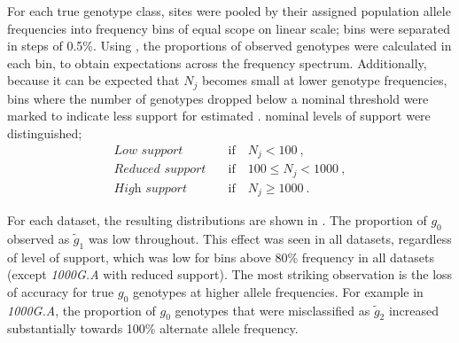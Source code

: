 For each true genotype class, sites were pooled by their assigned population allele frequencies
into  frequency bins of equal scope on linear scale; \ie bins were separated in steps of 0.5\%.
Using , the proportions of observed genotypes were calculated in each bin, to obtain  expectations across the frequency spectrum.
Additionally, because it can be expected that $N_j$ becomes small at lower genotype frequencies, bins where the number of genotypes dropped below a nominal threshold were marked to indicate less support for estimated .
 nominal levels of support were distinguished;
\begin{align*}
	\textit{Low support}     & \quad\text{if}\quad {N_j < 100}\ , \\
	\textit{Reduced support} & \quad\text{if}\quad {100 \leq N_j < 1000}\ , \\
	\textit{High support}    & \quad\text{if}\quad {N_j \geq 1000}\ .
\end{align*}

%
\label{sec:emp_gen_err_prop}
%

For each dataset, the resulting  distributions are shown in .
The proportion of $g_0$ observed as $\tilde{g}_1$ was low throughout.
This effect was seen in all  datasets, regardless of level of support, which was low for bins above 80\% frequency in all datasets (except \emph{1000G.A} with reduced support).
The most striking observation is the loss of accuracy for true $g_0$ genotypes at higher allele frequencies.
For example in \emph{1000G.A}, the proportion of $g_0$ genotypes that were misclassified as $\tilde{g}_2$ increased substantially towards 100\% alternate allele frequency.


